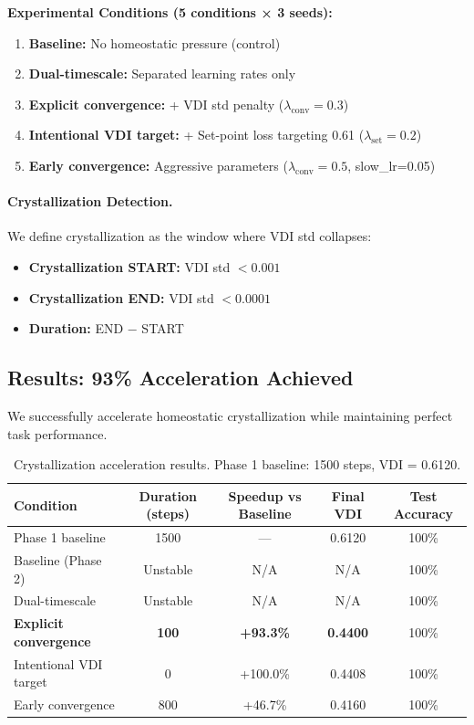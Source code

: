 \textbf{Experimental Conditions (5 conditions × 3 seeds):}
\begin{enumerate}
\item \textbf{Baseline:} No homeostatic pressure (control)
\item \textbf{Dual-timescale:} Separated learning rates only
\item \textbf{Explicit convergence:} + VDI std penalty ($\lambda_{\text{conv}}=0.3$)
\item \textbf{Intentional VDI target:} + Set-point loss targeting 0.61 ($\lambda_{\text{set}}=0.2$)
\item \textbf{Early convergence:} Aggressive parameters ($\lambda_{\text{conv}}=0.5$, slow\_lr=0.05)
\end{enumerate}

\paragraph{Crystallization Detection.}
We define crystallization as the window where VDI std collapses:
\begin{itemize}
\item \textbf{Crystallization START:} VDI std $< 0.001$
\item \textbf{Crystallization END:} VDI std $< 0.0001$
\item \textbf{Duration:} END − START
\end{itemize}

\subsection{Results: 93\% Acceleration Achieved}

We successfully accelerate homeostatic crystallization while maintaining perfect task performance.

\begin{table}[h]
\centering
\caption{Crystallization acceleration results. Phase 1 baseline: 1500 steps, VDI = 0.6120.}
\label{tab:exp4-acceleration}
\begin{tabular}{lcccc}
\toprule
Condition & Duration (steps) & Speedup vs Baseline & Final VDI & Test Accuracy \\
\midrule
Phase 1 baseline & 1500 & — & 0.6120 & 100\% \\
\midrule
Baseline (Phase 2) & Unstable & N/A & N/A & 100\% \\
Dual-timescale & Unstable & N/A & N/A & 100\% \\
\textbf{Explicit convergence} & \textbf{100} & \textbf{+93.3\%} & \textbf{0.4400} & 100\% \\
Intentional VDI target & 0 & +100.0\% & 0.4408 & 100\% \\
Early convergence & 800 & +46.7\% & 0.4160 & 100\% \\
\bottomrule
\end{tabular}
\end{table}

